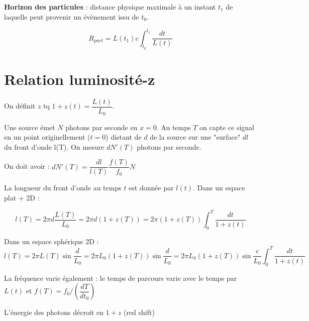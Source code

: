 \documentclass[11pt]{article} %
\newcommand{\dint}{\displaystyle \int}
\begin{document}
\textbf{Horizon des particules} : distance physique maximale à un instant $t_1$ de laquelle peut provenir un évènement issu de $t_0$.

\begin{equation}
R_{part} = L(t_1) c \dint_{t_0}^{t_1} \dfrac{dt}{L(t)}
\end{equation}

\section{Relation luminosité-z}

On définit $z$ tq $1+z(t) = \dfrac{L(t)}{L_0}$.

Une source émet $N$ photons par seconde en $x = 0$. Au temps $T$ on capte ce signal en un point originellement ($t = 0$) distant de $d$ de la source sur une "surface" $dl$ du front d'onde l(T). On mesure $dN'(T)$ photons par seconde.

On doit avoir :
$dN'(T) = \dfrac{dl}{l(T)} \dfrac{f(T)}{f_0} N$


La longueur du front d'onde au temps $t$ est donnée par $l(t)$. Dans un espace plat + 2D :

\begin{equation}
l(T) = 2\pi d \dfrac{L(T)}{L_0} = 2\pi d (1+z(T)) = 2\pi (1+z(T)) \dint_0^T \dfrac{dt}{1+z(t)}
\end{equation}

Dans un espace sphérique 2D :
\begin{equation}
l(T) = 2\pi L(T) \sin \dfrac{d}{L_0} = 2\pi L_0 (1+z(T)) \sin \dfrac{d}{L_0}  = 2\pi L_0 (1+z(T)) \sin \dfrac{c}{L_0} \dint_0^T \dfrac{dt}{1+z(t)}
\end{equation}

La fréquence varie également : le temps de parcours varie avec le temps par $L(t)$ et $f(T) = f_0/(\dfrac{dT}{dt_0})$


L'énergie des photons décroit en $1+z$ (red shift) 
\end{document}
